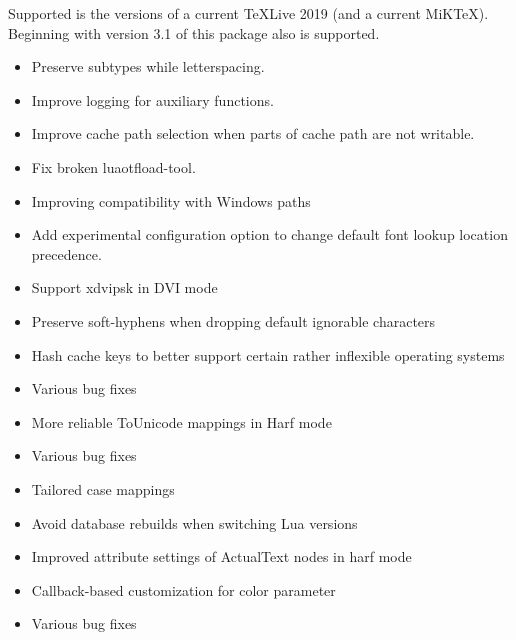 Supported is the  versions of a current TeXLive 2019 (and a current MiKTeX). Beginning with version 3.1 of this package also  is supported.
\endsection

\begin{itemize}
  \item Preserve subtypes while letterspacing.
  \item Improve logging for auxiliary functions.
  \item Improve cache path selection when parts of cache path are not writable.
  \item Fix broken luaotfload-tool.
\end{itemize}
\endsubsection

\begin{itemize}
  \item Improving compatibility with Windows paths
\end{itemize}
\endsubsection

\begin{itemize}
  \item Add experimental configuration option to change default font lookup location
    precedence.
  \item Support xdvipsk in DVI mode
  \item Preserve soft-hyphens when dropping default ignorable characters
  \item Hash cache keys to better support certain rather inflexible operating
    systems
  \item Various bug fixes
\end{itemize}
\endsubsection

\begin{itemize}
  \item More reliable ToUnicode mappings in Harf mode
  \item Various bug fixes
\end{itemize}
\endsubsection

\begin{itemize}
  \item Tailored case mappings
  \item Avoid database rebuilds when switching Lua versions
  \item Improved attribute settings of ActualText nodes in harf mode
  \item Callback-based customization for color parameter
  \item Various bug fixes
\end{itemize}
\endsubsection

